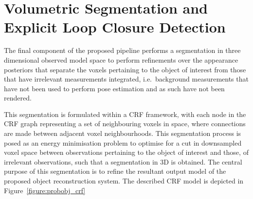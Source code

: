 \section{Volumetric Segmentation and Explicit Loop Closure Detection}
The final component of the proposed pipeline performs a segmentation in three
dimensional observed model space to perform refinements over the appearance
posteriors that separate the voxels pertaining to the object of interest from
those that have irrelevant measurements integrated, i.e.\ background measurements
that have not been used to perform pose estimation and as such have not been rendered.

This segmentation is formulated within a CRF framework, with each node in the
CRF graph representing a set of neighbouring voxels in space, where connections
are made between adjacent voxel neighbourhoods. This segmentation process is
posed as an energy minimisation problem to optimise for a cut in downsampled
voxel space between observations pertaining to the object of interest and those,
of irrelevant observations, such that a segmentation in 3D is obtained. The
central purpose of this segmentation is to refine the resultant output model of
the proposed object reconstruction system. The described CRF model is depicted
in Figure~\ref{figure:probobj_crf}

